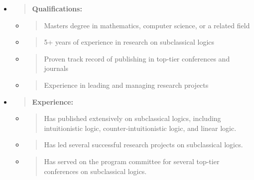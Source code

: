 \begin{itemize}
\item
  \begin{quote}
  \textbf{Qualifications:\\
  }
  \end{quote}

  \begin{itemize}
  \item
    \begin{quote}
    Master\textquotesingle s degree in mathematics, computer science, or
    a related field
    \end{quote}
  \item
    \begin{quote}
    5+ years of experience in research on subclassical logics
    \end{quote}
  \item
    \begin{quote}
    Proven track record of publishing in top-tier conferences and
    journals
    \end{quote}
  \item
    \begin{quote}
    Experience in leading and managing research projects
    \end{quote}
  \end{itemize}
\item
  \begin{quote}
  \textbf{Experience:\\
  }
  \end{quote}

  \begin{itemize}
  \item
    \begin{quote}
    Has published extensively on subclassical logics, including
    intuitionistic logic, counter-intuitionistic logic, and linear
    logic.
    \end{quote}
  \item
    \begin{quote}
    Has led several successful research projects on subclassical logics.
    \end{quote}
  \item
    \begin{quote}
    Has served on the program committee for several top-tier conferences
    on subclassical logics.
    \end{quote}
  \end{itemize}
\end{itemize}

